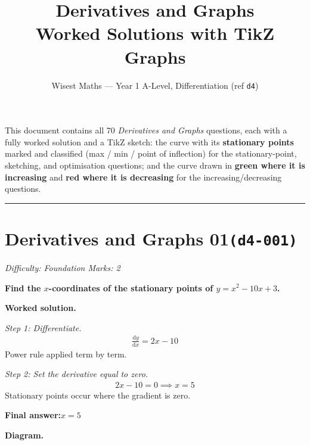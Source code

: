 \documentclass[11pt]{article}
\title{\textbf{Derivatives and Graphs}\\[0.3em]\large Worked Solutions with TikZ Graphs}
\author{Wisest Maths --- Year 1 A-Level, Differentiation (ref \texttt{d4})}
\date{}
\newcommand{\question}[1]{\par\medskip\noindent\textbf{#1}\par}
\begin{document}
\maketitle
\noindent This document contains all 70 \emph{Derivatives and Graphs} questions, each with a fully
worked solution and a TikZ sketch: the curve with its \textbf{stationary points} marked and classified
(max / min / point of inflection) for the stationary-point, sketching, and optimisation questions; and the
curve drawn in \textcolor{green!55!black}{\textbf{green where it is increasing}} and
\textcolor{red!70!black}{\textbf{red where it is decreasing}} for the increasing/decreasing questions.
\tableofcontents
\bigskip
\hrule

\section*{Derivatives and Graphs 01\quad\small\texttt{(d4-001)}}
\textit{Difficulty: Foundation \quad\textbar\quad Marks: 2}

\question{Find the \( x \)-coordinates of the stationary points of \( y = x^2 - 10x + 3 \).}

\textbf{Worked solution.}

\textit{Step 1: Differentiate.}
\[\begin{gathered}
\frac{\mathrm{d}y}{\mathrm{d}x} = 2x - 10
\end{gathered}\]
Power rule applied term by term.

\textit{Step 2: Set the derivative equal to zero.}
\[\begin{gathered}
2x - 10 = 0 \implies x = 5
\end{gathered}\]
Stationary points occur where the gradient is zero.

\begin{answerbox}
\textbf{Final answer:}\quad \(\displaystyle  x = 5 \)
\end{answerbox}
\textbf{Diagram.}
\end{document}
